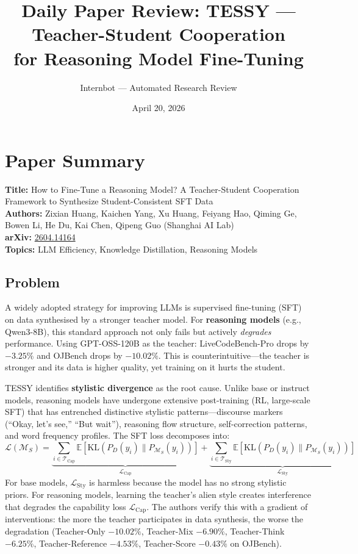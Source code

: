 \documentclass[11pt]{article}
\title{Daily Paper Review: TESSY --- Teacher-Student Cooperation\\for Reasoning Model Fine-Tuning}
\author{Internbot --- Automated Research Review}
\date{April 20, 2026}
\begin{document}
\maketitle

\section{Paper Summary}

\textbf{Title:} How to Fine-Tune a Reasoning Model? A Teacher-Student Cooperation Framework to Synthesize Student-Consistent SFT Data \\
\textbf{Authors:} Zixian Huang, Kaichen Yang, Xu Huang, Feiyang Hao, Qiming Ge, Bowen Li, He Du, Kai Chen, Qipeng Guo (Shanghai AI Lab) \\
\textbf{arXiv:} \href{https://arxiv.org/abs/2604.14164}{2604.14164} \\
\textbf{Topics:} LLM Efficiency, Knowledge Distillation, Reasoning Models

\subsection{Problem}

A widely adopted strategy for improving LLMs is supervised fine-tuning (SFT) on data synthesised by a stronger teacher model. For \textbf{reasoning models} (e.g., Qwen3-8B), this standard approach not only fails but actively \textit{degrades} performance. Using GPT-OSS-120B as the teacher: LiveCodeBench-Pro drops by $-3.25\%$ and OJBench drops by $-10.02\%$. This is counterintuitive---the teacher is stronger and its data is higher quality, yet training on it hurts the student.

TESSY identifies \textbf{stylistic divergence} as the root cause. Unlike base or instruct models, reasoning models have undergone extensive post-training (RL, large-scale SFT) that has entrenched distinctive stylistic patterns---discourse markers (``Okay, let's see,'' ``But wait''), reasoning flow structure, self-correction patterns, and word frequency profiles. The SFT loss decomposes into:
\begin{equation}
    \mathcal{L}(\mathcal{M}_S) = \underbrace{\sum_{i \in \mathcal{T}_{\mathrm{Cap}}} \mathbb{E}\!\left[\mathrm{KL}\!\left(P_D(y_i) \| P_{\mathcal{M}_S}(y_i)\right)\right]}_{\mathcal{L}_{\mathrm{Cap}}} + \underbrace{\sum_{i \in \mathcal{T}_{\mathrm{Sty}}} \mathbb{E}\!\left[\mathrm{KL}\!\left(P_D(y_i) \| P_{\mathcal{M}_S}(y_i)\right)\right]}_{\mathcal{L}_{\mathrm{Sty}}}
\end{equation}
For base models, $\mathcal{L}_{\mathrm{Sty}}$ is harmless because the model has no strong stylistic priors. For reasoning models, learning the teacher's alien style creates interference that degrades the capability loss $\mathcal{L}_{\mathrm{Cap}}$. The authors verify this with a gradient of interventions: the more the teacher participates in data synthesis, the worse the degradation (Teacher-Only $-10.02\%$, Teacher-Mix $-6.90\%$, Teacher-Think $-6.25\%$, Teacher-Reference $-4.53\%$, Teacher-Score $-0.43\%$ on OJBench).
\end{document}
